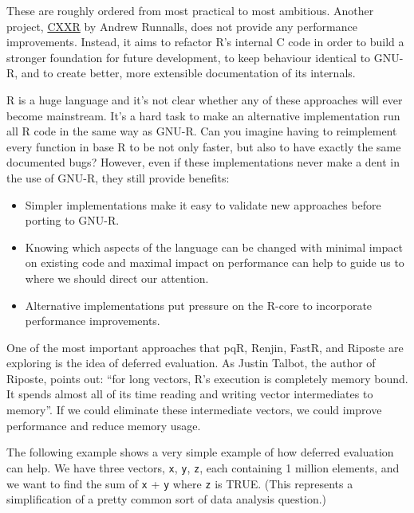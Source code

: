These are roughly ordered from most practical to most ambitious. Another
project, \href{http://www.cs.kent.ac.uk/projects/cxxr/}{CXXR} by Andrew
Runnalls, does not provide any performance improvements. Instead, it
aims to refactor R's internal C code in order to build a stronger
foundation for future development, to keep behaviour identical to GNU-R,
and to create better, more extensible documentation of its internals.

R is a huge language and it's not clear whether any of these approaches
will ever become mainstream. It's a hard task to make an alternative
implementation run all R code in the same way as GNU-R. Can you imagine
having to reimplement every function in base R to be not only faster,
but also to have exactly the same documented bugs? However, even if
these implementations never make a dent in the use of GNU-R, they still
provide benefits:

\begin{itemize}
\item
  Simpler implementations make it easy to validate new approaches before
  porting to GNU-R.
\item
  Knowing which aspects of the language can be changed with minimal
  impact on existing code and maximal impact on performance can help to
  guide us to where we should direct our attention.
\item
  Alternative implementations put pressure on the R-core to incorporate
  performance improvements.
\end{itemize}

One of the most important approaches that pqR, Renjin, FastR, and
Riposte are exploring is the idea of deferred evaluation. As Justin
Talbot, the author of Riposte, points out: ``for long vectors, R's
execution is completely memory bound. It spends almost all of its time
reading and writing vector intermediates to memory''. If we could
eliminate these intermediate vectors, we could improve performance and
reduce memory usage. 

The following example shows a very simple example of how deferred
evaluation can help. We have three vectors, \texttt{x}, \texttt{y},
\texttt{z}, each containing 1 million elements, and we want to find the
sum of \texttt{x} + \texttt{y} where \texttt{z} is TRUE. (This
represents a simplification of a pretty common sort of data analysis
question.)

\begin{Shaded}
\begin{Highlighting}[]
\StringTok{ }\NormalTok{(}\NormalTok{)}
\StringTok{ }\NormalTok{(}\NormalTok{)}
\StringTok{ }\NormalTok{(}\NormalTok{, } \NormalTok{)}

\OperatorTok{+}\StringTok{ }
\end{Highlighting}
\end{Shaded}


